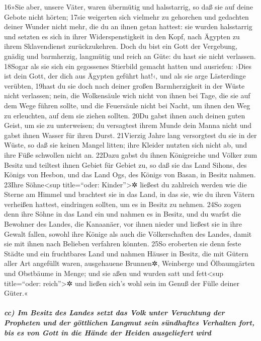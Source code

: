 16»Sie aber, unsere Väter, waren übermütig und halsstarrig, so daß sie
auf deine Gebote nicht hörten; 17sie weigerten sich vielmehr zu
gehorchen und gedachten deiner Wunder nicht mehr, die du an ihnen getan
hattest: sie wurden halsstarrig und setzten es sich in ihrer
Widerspenstigkeit in den Kopf, nach Ägypten zu ihrem Sklavendienst
zurückzukehren. Doch du bist ein Gott der Vergebung, gnädig und
barmherzig, langmütig und reich an Güte: du hast sie nicht verlassen.
18Sogar als sie sich ein gegossenes Stierbild gemacht hatten und
ausriefen: ›Dies ist dein Gott, der dich aus Ägypten geführt hat!‹, und
als sie arge Lästerdinge verübten, 19hast du sie doch nach deiner großen
Barmherzigkeit in der Wüste nicht verlassen; nein, die Wolkensäule wich
nicht von ihnen bei Tage, die sie auf dem Wege führen sollte, und die
Feuersäule nicht bei Nacht, um ihnen den Weg zu erleuchten, auf dem sie
ziehen sollten. 20Du gabst ihnen auch deinen guten Geist, um sie zu
unterweisen; du versagtest ihrem Munde dein Manna nicht und gabst ihnen
Wasser für ihren Durst. 21Vierzig Jahre lang versorgtest du sie in der
Wüste, so daß sie keinen Mangel litten; ihre Kleider nutzten sich nicht
ab, und ihre Füße schwollen nicht an. 22Dazu gabst du ihnen Königreiche
und Völker zum Besitz und teiltest ihnen Gebiet für Gebiet zu, so daß
sie das Land Sihons, des Königs von Hesbon, und das Land Ogs, des Königs
von Basan, in Besitz nahmen. 23Ihre Söhne\textless sup title=``oder:
Kinder''\textgreater✲ ließest du zahlreich werden wie die Sterne am
Himmel und brachtest sie in das Land, in das sie, wie du ihren Vätern
verheißen hattest, eindringen sollten, um es in Besitz zu nehmen. 24So
zogen denn ihre Söhne in das Land ein und nahmen es in Besitz, und du
warfst die Bewohner des Landes, die Kanaanäer, vor ihnen nieder und
ließest sie in ihre Gewalt fallen, sowohl ihre Könige als auch die
Völkerschaften des Landes, damit sie mit ihnen nach Belieben verfahren
könnten. 25So eroberten sie denn feste Städte und ein fruchtbares Land
und nahmen Häuser in Besitz, die mit Gütern aller Art angefüllt waren,
ausgehauene Brunnen✲, Weinberge und Ölbaumgärten und Obstbäume in Menge;
und sie aßen und wurden satt und fett\textless sup title=``oder:
reich''\textgreater✲ und ließen sich's wohl sein im Genuß der Fülle
deiner Güter.«

\hypertarget{cc-im-besitz-des-landes-setzt-das-volk-unter-verachtung-der-propheten-und-der-guxf6ttlichen-langmut-sein-suxfcndhaftes-verhalten-fort-bis-es-von-gott-in-die-huxe4nde-der-heiden-ausgeliefert-wird}{%
\subparagraph{cc) Im Besitz des Landes setzt das Volk unter Verachtung
der Propheten und der göttlichen Langmut sein sündhaftes Verhalten fort,
bis es von Gott in die Hände der Heiden ausgeliefert
wird}\label{cc-im-besitz-des-landes-setzt-das-volk-unter-verachtung-der-propheten-und-der-guxf6ttlichen-langmut-sein-suxfcndhaftes-verhalten-fort-bis-es-von-gott-in-die-huxe4nde-der-heiden-ausgeliefert-wird}}

